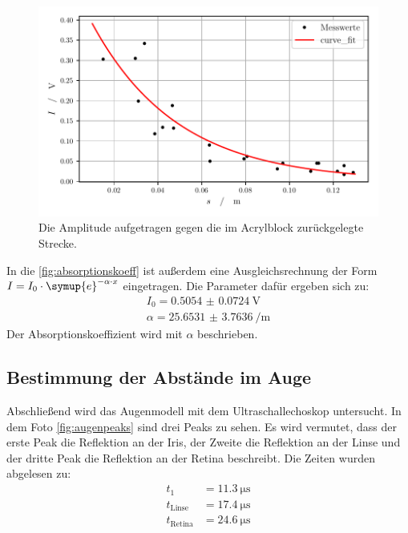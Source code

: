   \begin{figure}[H]
    \centering
    \includegraphics[width=\textwidth]{build/absorptionskoeff.pdf}
    \caption{Die Amplitude aufgetragen gegen die im Acrylblock zurückgelegte Strecke.}
    \label{fig:absorptionskoeff}
  \end{figure}

  \noindent In die \autoref{fig:absorptionskoeff} ist außerdem eine Ausgleichsrechnung der Form $ I = I_0 \cdot \symup{e}^{-\alpha \cdot x} $ eingetragen. 
  Die Parameter dafür ergeben sich zu: 
  \begin{align*}
    I_0 = \SI{0.5054(724)}{\volt}\\
    \alpha = \SI{25.6531(37636)}{\per\metre}
  \end{align*}
  Der Absorptionskoeffizient wird mit $\alpha$ beschrieben.


\subsection{Bestimmung der Abstände im Auge}

  Abschließend wird das Augenmodell mit dem Ultraschallechoskop untersucht. In dem Foto \ref{fig:augenpeaks} sind drei Peaks zu sehen. Es wird vermutet, dass der 
  erste Peak die Reflektion an der Iris, der Zweite die Reflektion an der Linse und der dritte Peak die Reflektion an der Retina beschreibt. Die Zeiten wurden 
  abgelesen zu:
  \begin{align*}
    t_1 &= \SI{11.3}{\micro\second} \\
    t_{\text{Linse}} &= \SI{17.4}{\micro\second}\\
    t_{\text{Retina}} &= \SI{24.6}{\micro\second}
  \end{align*}

